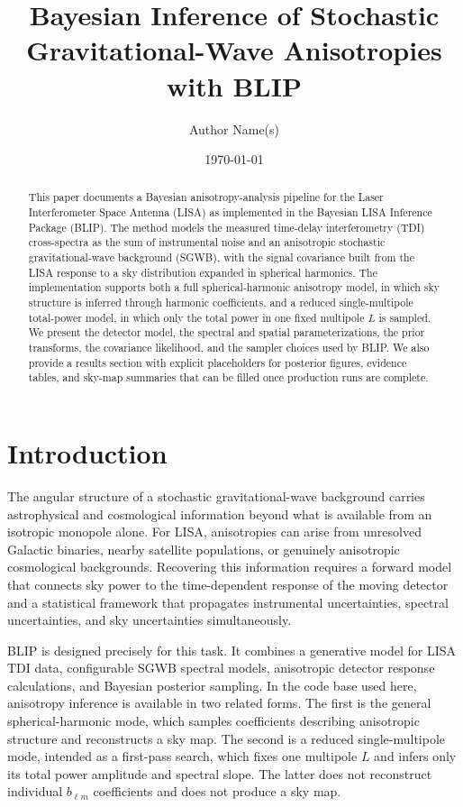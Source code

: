 \documentclass[11pt]{article}
\title{Bayesian Inference of Stochastic Gravitational-Wave Anisotropies with BLIP}
\author{Author Name(s)}
\date{\today}
\begin{document}
\maketitle

\begin{abstract}
This paper documents a Bayesian anisotropy-analysis pipeline for the Laser Interferometer Space Antenna (LISA) as implemented in the Bayesian LISA Inference Package (BLIP). The method models the measured time-delay interferometry (TDI) cross-spectra as the sum of instrumental noise and an anisotropic stochastic gravitational-wave background (SGWB), with the signal covariance built from the LISA response to a sky distribution expanded in spherical harmonics. The implementation supports both a full spherical-harmonic anisotropy model, in which sky structure is inferred through harmonic coefficients, and a reduced single-multipole total-power model, in which only the total power in one fixed multipole $L$ is sampled. We present the detector model, the spectral and spatial parameterizations, the prior transforms, the covariance likelihood, and the sampler choices used by BLIP. We also provide a results section with explicit placeholders for posterior figures, evidence tables, and sky-map summaries that can be filled once production runs are complete.
\end{abstract}

\section{Introduction}
The angular structure of a stochastic gravitational-wave background carries astrophysical and cosmological information beyond what is available from an isotropic monopole alone. For LISA, anisotropies can arise from unresolved Galactic binaries, nearby satellite populations, or genuinely anisotropic cosmological backgrounds. Recovering this information requires a forward model that connects sky power to the time-dependent response of the moving detector and a statistical framework that propagates instrumental uncertainties, spectral uncertainties, and sky uncertainties simultaneously.

BLIP is designed precisely for this task. It combines a generative model for LISA TDI data, configurable SGWB spectral models, anisotropic detector response calculations, and Bayesian posterior sampling. In the code base used here, anisotropy inference is available in two related forms. The first is the general spherical-harmonic mode, which samples coefficients describing anisotropic structure and reconstructs a sky map. The second is a reduced single-multipole mode, intended as a first-pass search, which fixes one multipole $L$ and infers only its total power amplitude and spectral slope. The latter does not reconstruct individual $b_{\ell m}$ coefficients and does not produce a sky map.
\end{document}
